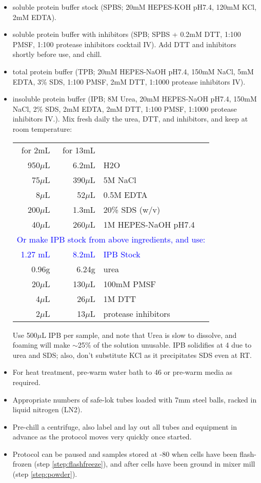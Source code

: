 \documentclass{article}
\newcommand{\mul}{\ensuremath{\mu}L\xspace}
\newcommand{\degC}{\celsius\xspace}
\newcommand{\tb}[1]{\textcolor{blue}{#1}}
\begin{document}
\begin{itemize}
  \item  soluble protein buffer stock (SPBS; 20mM HEPES-KOH pH7.4, 120mM KCl, 2mM EDTA).
\item  soluble protein buffer with inhibitors (SPB; SPBS + 0.2mM DTT,  1:100 PMSF, 1:100 protease inhibitors cocktail IV). Add DTT and inhibitors shortly before use, and chill.
\item total protein buffer (TPB;   20mM HEPES-NaOH pH7.4, 150mM NaCl, 5mM EDTA, 3\% SDS, 1:100 PMSF, 2mM DTT, 1:1000 protease inhibitors IV). 
  \item insoluble protein buffer (IPB; 8M Urea, 20mM HEPES-NaOH pH7.4, 150mM NaCl, 2\% SDS, 2mM EDTA, 2mM DTT, 1:100 PMSF, 1:1000 protease inhibitors IV.). Mix fresh daily the urea, DTT, and inhibitors, and keep at room temperature:
  
\begin{tabular}{rrl}
for 2mL & for 13mL & \\
950\mul & 6.2mL & H2O \\
75\mul &  390\mul & 5M NaCl \\
8\mul &  52\mul & 0.5M EDTA \\
200\mul & 1.3mL & 20\% SDS (w/v) \\
\ 40\mul & 260\mul & 1M HEPES-NaOH pH7.4 \\
\multicolumn{3}{l}{\tb{Or make IPB stock from above ingredients, and use:}} \\
\tb{1.27 mL} & \tb{8.2mL} & \tb{IPB Stock} \\
  0.96g &  6.24g & urea \\
\ 20\mul & 130\mul & 100mM PMSF \\
\ 4\mul & 26\mul & 1M DTT \\
\ \ 2\mul & 13\mul & protease inhibitors \\
\end{tabular}

  Use 500\mul IPB per sample, and note that Urea is slow to dissolve, and foaming will make $\sim$25\% of the solution unusable. IPB solidifies at 4\degC due to urea and SDS; also, don't substitute KCl as it precipitates SDS even at RT.

     \item For heat treatment, pre-warm water bath to 46\degC or pre-warm media as required.
      \item Appropriate numbers of safe-lok tubes loaded with 7mm steel balls, racked in liquid nitrogen (LN2).
    \item Pre-chill a centrifuge, also label and lay out all tubes and equipment in advance as the protocol moves very quickly once started. 
    \item Protocol can be paused and samples stored at -80\degC when cells have been flash-frozen (step \ref{step:flashfreeze}), and after cells have been ground in mixer mill (step \ref{step:powder}).
\end{itemize}
\end{document}
